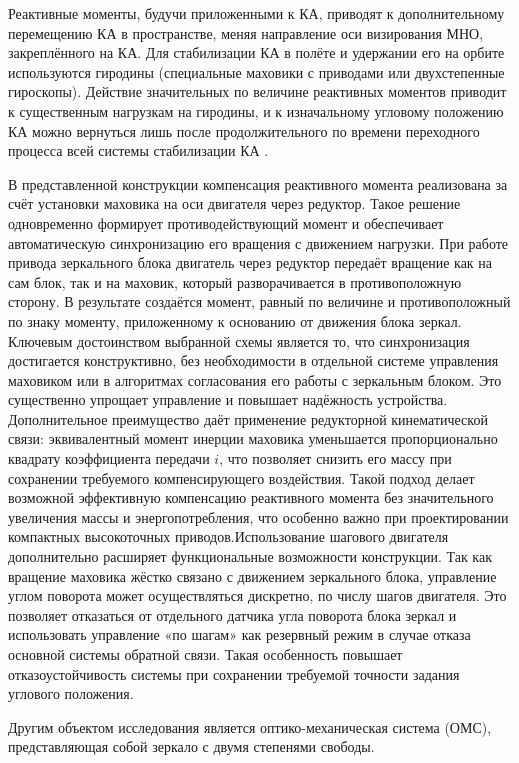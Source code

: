 Реактивные моменты, будучи приложенными к КА, приводят к дополнительному перемещению КА в пространстве, меняя направление оси визирования МНО, закреплённого на КА. Для стабилизации КА в полёте и удержании его на орбите используются гиродины (специальные маховики с приводами или двухстепенные гироскопы). Действие значительных по величине реактивных моментов приводит к существенным нагрузкам на гиродины, и к изначальному угловому положению КА можно вернуться лишь после продолжительного по времени переходного процесса всей системы стабилизации КА \cite{углова2019оценка, zhao2023effect}.

В представленной конструкции компенсация реактивного момента реализована за счёт установки маховика на оси двигателя через редуктор. Такое решение одновременно формирует противодействующий момент и обеспечивает автоматическую синхронизацию его вращения с движением нагрузки. При работе привода зеркального блока двигатель через редуктор передаёт вращение как на сам блок, так и на маховик, который разворачивается в противоположную сторону. В результате создаётся момент, равный по величине и противоположный по знаку моменту, приложенному к основанию от движения блока зеркал. Ключевым достоинством выбранной схемы является то, что синхронизация достигается конструктивно, без необходимости в отдельной системе управления маховиком или в алгоритмах согласования его работы с зеркальным блоком. Это существенно упрощает управление и повышает надёжность устройства. Дополнительное преимущество даёт применение редукторной кинематической связи: эквивалентный момент инерции маховика уменьшается пропорционально квадрату коэффициента передачи $i$, что позволяет снизить его массу при сохранении требуемого компенсирующего воздействия. Такой подход делает возможной эффективную компенсацию реактивного момента без значительного увеличения массы и энергопотребления, что особенно важно при проектировании компактных высокоточных приводов.Использование шагового двигателя дополнительно расширяет функциональные возможности конструкции. Так как вращение маховика жёстко связано с движением зеркального блока, управление углом поворота может осуществляться дискретно, по числу шагов двигателя. Это позволяет отказаться от отдельного датчика угла поворота блока зеркал и использовать управление «по шагам» как резервный режим в случае отказа основной системы обратной связи. Такая особенность повышает отказоустойчивость системы при сохранении требуемой точности задания углового положения.

Другим объектом исследования является оптико-механическая система (ОМС), представляющая собой зеркало с двумя степенями свободы.

